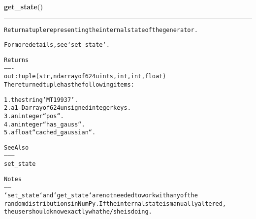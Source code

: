     \vspace{0.5ex}

\hspace{.8\funcindent}\begin{boxedminipage}{\funcwidth}

    \raggedright \textbf{get\_state}()

    \vspace{-1.5ex}

    \rule{\textwidth}{0.5\fboxrule}
\setlength{\parskip}{2ex}
\begin{alltt}
Return a tuple representing the internal state of the generator.

For more details, see `set\_state`.

Returns
-------
out : tuple(str, ndarray of 624 uints, int, int, float)
    The returned tuple has the following items:

    1. the string 'MT19937'.
    2. a 1-D array of 624 unsigned integer keys.
    3. an integer ``pos``.
    4. an integer ``has\_gauss``.
    5. a float ``cached\_gaussian``.

See Also
--------
set\_state

Notes
-----
`set\_state` and `get\_state` are not needed to work with any of the
random distributions in NumPy. If the internal state is manually altered,
the user should know exactly what he/she is doing.
\end{alltt}

\setlength{\parskip}{1ex}
    \end{boxedminipage}

    \label{trunk:qstkutil:bollinger:gumbel}

    \vspace{0.5ex}

